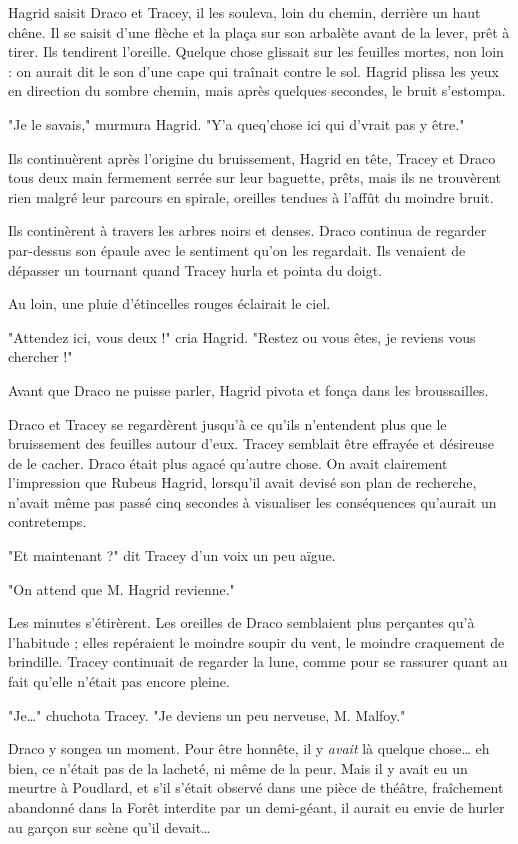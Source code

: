 Hagrid saisit Draco et Tracey, il les souleva, loin du chemin, derrière un haut chêne. Il se saisit d'une flèche et la plaça sur son arbalète avant de la lever, prêt à tirer. Ils tendirent l'oreille. Quelque chose glissait sur les feuilles mortes, non loin : on aurait dit le son d'une cape qui traînait contre le sol. Hagrid plissa les yeux en direction du sombre chemin, mais après quelques secondes, le bruit s'estompa.

"Je le savais," murmura Hagrid. "Y'a queq'chose ici qui d'vrait pas y être."

Ils continuèrent après l'origine du bruissement, Hagrid en tête, Tracey et Draco tous deux main fermement serrée sur leur baguette, prêts, mais ils ne trouvèrent rien malgré leur parcours en spirale, oreilles tendues à l'affût du moindre bruit.

Ils continèrent à travers les arbres noirs et denses. Draco continua de regarder par-dessus son épaule avec le sentiment qu'on les regardait. Ils venaient de dépasser un tournant quand Tracey hurla et pointa du doigt.

Au loin, une pluie d'étincelles rouges éclairait le ciel.

"Attendez ici, vous deux !" cria Hagrid. "Restez ou vous êtes, je reviens vous chercher !"

Avant que Draco ne puisse parler, Hagrid pivota et fonça dans les broussailles.

Draco et Tracey se regardèrent jusqu'à ce qu'ils n'entendent plus que le bruissement des feuilles autour d'eux. Tracey semblait être effrayée et désireuse de le cacher. Draco était plus agacé qu'autre chose. On avait clairement l'impression que Rubeus Hagrid, lorsqu'il avait devisé son plan de recherche, n'avait même pas passé cinq secondes à visualiser les conséquences qu'aurait un contretemps.

"Et maintenant ?" dit Tracey d'un voix un peu aïgue.

"On attend que M. Hagrid revienne."

Les minutes s'étirèrent. Les oreilles de Draco semblaient plus perçantes qu'à l'habitude ; elles repéraient le moindre soupir du vent, le moindre craquement de brindille. Tracey continuait de regarder la lune, comme pour se rassurer quant au fait qu'elle n'était pas encore pleine.

"Je…" chuchota Tracey. "Je deviens un peu nerveuse, M. Malfoy."

Draco y songea un moment. Pour être honnête, il y \emph{avait}  là quelque chose… eh bien, ce n'était pas de la lacheté, ni même de la peur. Mais il y avait eu un meurtre à Poudlard, et s'il s'était observé dans une pièce de théâtre, fraîchement abandonné dans la Forêt interdite par un demi-géant, il aurait eu envie de hurler au garçon sur scène qu'il devait…

